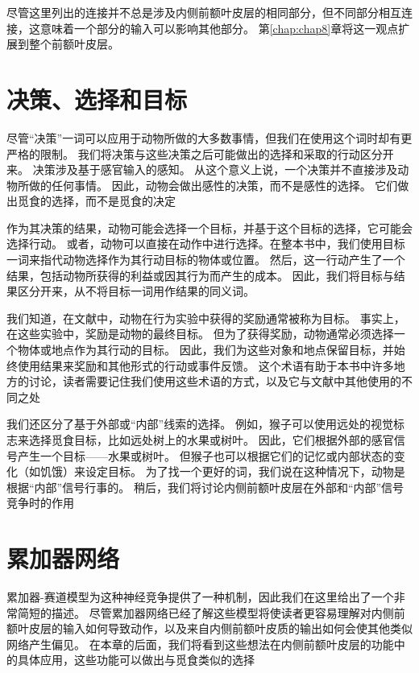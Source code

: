 尽管这里列出的连接并不总是涉及内侧前额叶皮层的相同部分，但不同部分相互连接\cite{barbas2000connections}，这意味着一个部分的输入可以影响其他部分。
第\ref{chap:chap8}章将这一观点扩展到整个前额叶皮层。\par



\section{决策、选择和目标}

尽管“决策”一词可以应用于动物所做的大多数事情，但我们在使用这个词时却有更严格的限制。
我们将决策与这些决策之后可能做出的选择和采取的行动区分开来\cite{schall2001neural}。
决策涉及基于感官输入的感知。
从这个意义上说，一个决策并不直接涉及动物所做的任何事情。
因此，动物会做出感性的决策，而不是感性的选择。
它们做出觅食的选择，而不是觅食的决定\par


作为其决策的结果，动物可能会选择一个目标，并基于这个目标的选择，它可能会选择行动。
或者，动物可以直接在动作中进行选择。在整本书中，我们使用目标一词来指代动物选择作为其行动目标的物体或位置。
然后，这一行动产生了一个结果，包括动物所获得的利益或因其行为而产生的成本。
因此，我们将目标与结果区分开来，从不将目标一词用作结果的同义词。\par


我们知道，在文献中，动物在行为实验中获得的奖励通常被称为目标。
事实上，在这些实验中，奖励是动物的最终目标。
但为了获得奖励，动物通常必须选择一个物体或地点作为其行动的目标。
因此，我们为这些对象和地点保留目标，并始终使用结果来奖励和其他形式的行动或事件反馈。
这个术语有助于本书中许多地方的讨论，读者需要记住我们使用这些术语的方式，以及它与文献中其他使用的不同之处\par


我们还区分了基于外部或“内部”线索的选择\cite{Passingham et al.2010}。
例如，猴子可以使用远处的视觉标志来选择觅食目标，比如远处树上的水果或树叶。
因此，它们根据外部的感官信号产生一个目标——水果或树叶。
但猴子也可以根据它们的记忆或内部状态的变化（如饥饿）来设定目标。
为了找一个更好的词，我们说在这种情况下，动物是根据“内部”信号行事的。
稍后，我们将讨论内侧前额叶皮层在外部和“内部”信号竞争时的作用\par



\section{累加器网络}

累加器-赛道模型为这种神经竞争提供了一种机制，因此我们在这里给出了一个非常简短的描述。
尽管累加器网络已经了解这些模型将使读者更容易理解对内侧前额叶皮层的输入如何导致动作，以及来自内侧前额叶皮质的输出如何会使其他类似网络产生偏见。
在本章的后面，我们将看到这些想法在内侧前额叶皮层的功能中的具体应用，这些功能可以做出与觅食类似的选择\par


